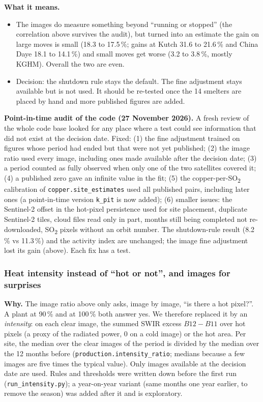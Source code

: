 \documentclass[10pt,a4paper]{article}
\newcommand{\SOtwo}{SO\textsubscript{2}}
\newcommand{\code}[1]{\texttt{\small #1}}
\begin{document}
\textbf{What it means.}
\begin{itemize}[leftmargin=1.2em]
  \item The images do measure something beyond ``running or stopped'' (the correlation above survives the audit), but turned into an estimate the gain on large moves is small (18.3 to 17.5\,\%; gains at Kutch 31.6 to 21.6\,\% and China Daye 18.1 to 14.1\,\%) and small moves get worse (3.2 to 3.8\,\%, mostly KGHM). Overall the two are even.
  \item Decision: the shutdown rule stays the default. The fine adjustment stays available but is not used. It should be re-tested once the 14 smelters are placed by hand and more published figures are added.
\end{itemize}

\textbf{Point-in-time audit of the code (27 November 2026).} A fresh review of the whole code base looked for any place where a test could see information that did not exist at the decision date. Fixed: (1) the fine adjustment trained on figures whose period had ended but that were not yet published; (2) the image ratio used every image, including ones made available after the decision date; (3) a period counted as fully observed when only one of the two satellites covered it; (4) a published zero gave an infinite value in the fit; (5) the copper-per-\SOtwo{} calibration of \code{copper.site\_estimates} used all published pairs, including later ones (a point-in-time version \code{k\_pit} is now added); (6) smaller issues: the Sentinel-2 offset in the hot-pixel persistence used for site placement, duplicate Sentinel-2 tiles, cloud files read only in part, months still being completed not re-downloaded, \SOtwo{} pixels without an orbit number. The shutdown-rule result (8.2\,\% vs 11.3\,\%) and the activity index are unchanged; the image fine adjustment lost its gain (above). Each fix has a test.

\subsubsection{Heat intensity instead of ``hot or not'', and images for surprises}\label{sec:intensity}

\textbf{Why.} The image ratio above only asks, image by image, ``is there a hot pixel?''. A plant at 90\,\% and at 100\,\% both answer yes. We therefore replaced it by an \emph{intensity}: on each clear image, the summed SWIR excess $B12-B11$ over hot pixels (a proxy of the radiated power, 0 on a cold image) or the hot area. Per site, the median over the clear images of the period is divided by the median over the 12 months before (\code{production.intensity\_ratio}; medians because a few images are five times the typical value). Only images available at the decision date are used. Rules and thresholds were written down before the first run (\code{run\_intensity.py}); a year-on-year variant (same months one year earlier, to remove the season) was added after it and is exploratory.
\end{document}
